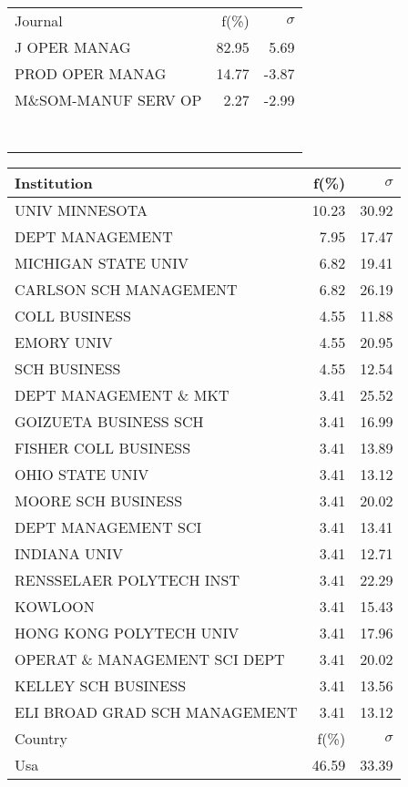 \documentclass[a4paper,11pt]{report}
\begin{document}
\begin{landscape}
\begin{table}[!ht]
{\begin{tabular}{|l r r|}
 &  & \\
\hline
\hline
Journal & f(\%) & $\sigma$\\
\hline
J OPER MANAG & 82.95 & 5.69\\
PROD OPER MANAG & 14.77 & -3.87\\
M\&SOM-MANUF SERV OP & 2.27 & -2.99\\
 &  & \\
 &  & \\
 &  & \\
 &  & \\
 &  & \\
 &  & \\
 &  & \\
\hline
\end{tabular}
}
{\scriptsize\begin{tabular}{|l r r|}
\hline
Institution & f(\%) & $\sigma$\\
\hline
UNIV MINNESOTA & 10.23 & 30.92\\
DEPT MANAGEMENT & 7.95 & 17.47\\
MICHIGAN STATE UNIV & 6.82 & 19.41\\
CARLSON SCH MANAGEMENT & 6.82 & 26.19\\
COLL BUSINESS & 4.55 & 11.88\\
EMORY UNIV & 4.55 & 20.95\\
SCH BUSINESS & 4.55 & 12.54\\
DEPT MANAGEMENT \& MKT & 3.41 & 25.52\\
GOIZUETA BUSINESS SCH & 3.41 & 16.99\\
FISHER COLL BUSINESS & 3.41 & 13.89\\
OHIO STATE UNIV & 3.41 & 13.12\\
MOORE SCH BUSINESS & 3.41 & 20.02\\
DEPT MANAGEMENT SCI & 3.41 & 13.41\\
INDIANA UNIV & 3.41 & 12.71\\
RENSSELAER POLYTECH INST & 3.41 & 22.29\\
KOWLOON & 3.41 & 15.43\\
HONG KONG POLYTECH UNIV & 3.41 & 17.96\\
OPERAT \& MANAGEMENT SCI DEPT & 3.41 & 20.02\\
KELLEY SCH BUSINESS & 3.41 & 13.56\\
ELI BROAD GRAD SCH MANAGEMENT & 3.41 & 13.12\\
\hline
\hline
Country & f(\%) & $\sigma$\\
\hline
Usa & 46.59 & 33.39\\

\end{tabular}}
\end{table}
\end{landscape}
\end{document}
